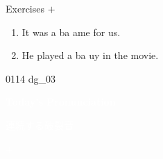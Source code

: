 \documentclass[aspectratio=169,xcolor={dvipsnames,table}]{beamer}
\begin{document}
\begin{frame}[plain]{Exercises  $+$ }
  \Large
  \begin{enumerate}
    \item<2-> It was a ba  ame for us.
    \item<4-> He played a ba  uy in the movie.
  \end{enumerate}

  \hfill{\tiny 0114}\,{\scriptsize {}\,dg\_03}

\end{frame}
\begin{frame}
  \hypertarget{today}{}
  \centering
  \textcolor{white}{\Huge\bfseries Today's Pronunciation}

  \vspace{30pt}

  \textcolor{white}{\Large 連続する破裂音}

  \textcolor{white}{\Large {} $+$ }
\end{frame}
\end{document}
